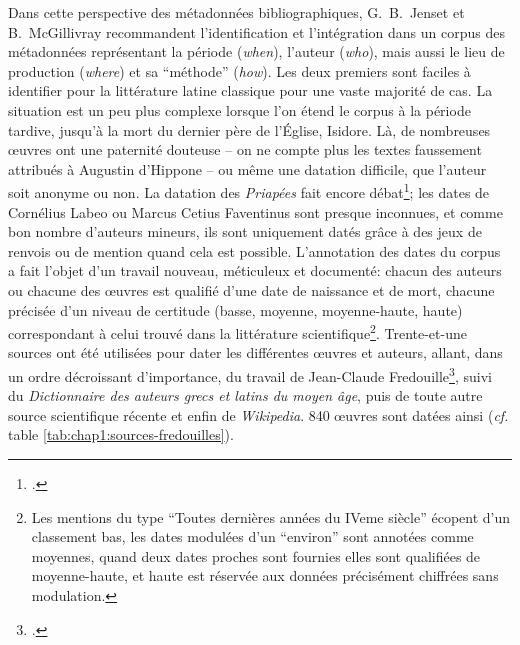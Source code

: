 Dans cette perspective des métadonnées bibliographiques, G.~B.~Jenset et B.~McGillivray recommandent l'identification et l'intégration dans un corpus des métadonnées représentant la période (\textit{when}), l'auteur (\textit{who}), mais aussi le lieu de production (\textit{where}) et sa \enquote{méthode} (\textit{how}). 
Les deux premiers sont faciles à identifier pour la littérature latine classique pour une vaste majorité de cas. La situation est un peu plus complexe lorsque l'on étend le corpus à la période tardive, jusqu'à la mort du dernier père de l'Église, Isidore. Là, de nombreuses œuvres ont une paternité douteuse -- on ne compte plus les textes faussement attribués à Augustin d'Hippone -- ou même une datation difficile, que l'auteur soit anonyme ou non. La datation des \textit{Priapées} fait encore débat\footcite{oconnor_carminis_2019}; les dates de Cornélius Labeo ou Marcus Cetius Faventinus sont presque inconnues, et comme bon nombre d'auteurs mineurs, ils sont uniquement datés grâce à des jeux de renvois ou de mention quand cela est possible. L'annotation des dates du corpus a fait l'objet d'un travail nouveau, méticuleux et documenté: chacun des auteurs ou chacune des œuvres est qualifié d'une date de naissance et de mort, chacune précisée d'un niveau de certitude (basse, moyenne, moyenne-haute, haute) correspondant à celui trouvé dans la littérature scientifique\footnote{Les mentions du type \enquote{Toutes dernières années du IVeme siècle} écopent d'un classement bas, les dates modulées d'un \enquote{environ} sont annotées comme moyennes, quand deux dates proches sont fournies elles sont qualifiées de moyenne-haute, et haute est réservée aux données précisément chiffrées sans modulation.}. Trente-et-une sources ont été utilisées pour dater les différentes œuvres et auteurs, allant, dans un ordre décroissant d'importance, du travail de Jean-Claude Fredouille\footcite{fredouille}, suivi du \textit{Dictionnaire des auteurs grecs et latins du moyen âge}\cite{buchwald_dictionnaire_1991}, puis de toute autre source scientifique récente et enfin de \textit{Wikipedia}. 840 œuvres sont datées ainsi (\textit{cf.} table \ref{tab:chap1:sources-fredouilles}).


